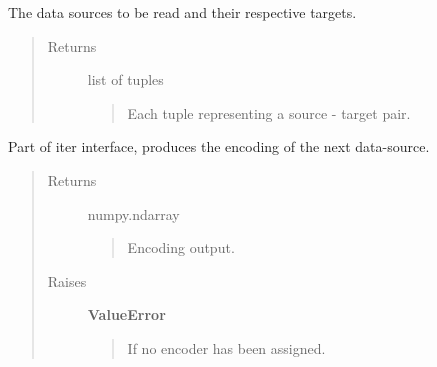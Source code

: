 \documentclass[letterpaper,10pt,english]{sphinxmanual}
\begin{document}
\begin{fulllineitems}
\begin{fulllineitems}
\label{fseq.reading:fseq.reading.seq_reader.SeqReader.dataType}
\end{fulllineitems}


\begin{fulllineitems}
\label{fseq.reading:fseq.reading.seq_reader.SeqReader.dataWidth}
\end{fulllineitems}


\begin{fulllineitems}
\label{fseq.reading:fseq.reading.seq_reader.SeqReader.jobQueue}
The data sources to be read and their respective targets.
\begin{quote}\begin{description}
\item[{Returns}] \leavevmode
list of tuples
\begin{quote}

Each tuple representing a source - target pair.
\end{quote}

\end{description}\end{quote}

\end{fulllineitems}


\begin{fulllineitems}
\label{fseq.reading:fseq.reading.seq_reader.SeqReader.next}
Part of iter interface, produces the encoding of the next
data-source.
\begin{quote}\begin{description}
\item[{Returns}] \leavevmode
numpy.ndarray
\begin{quote}

Encoding output.
\end{quote}

\item[{Raises}] \leavevmode
\textbf{ValueError}
\begin{quote}

If no encoder has been assigned.
\end{quote}


\end{description}
\end{quote}
\end{fulllineitems}
\end{fulllineitems}
\end{document}
